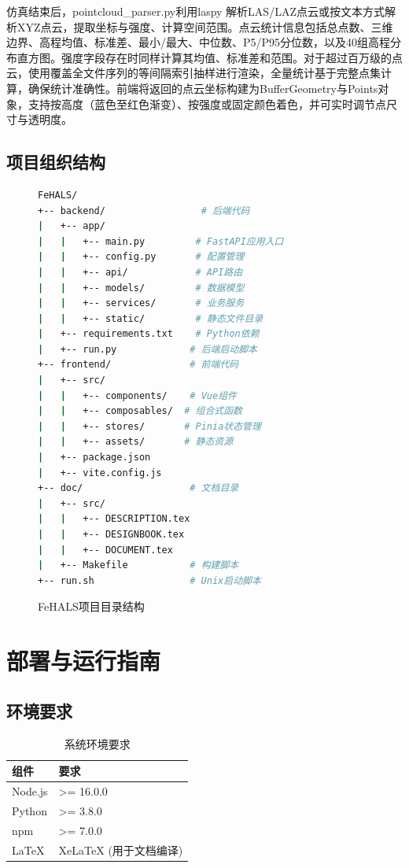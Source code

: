 \documentclass[a4paper,fleqn]{cas-sc}
\begin{document}
仿真结束后，pointcloud\_parser.py利用laspy \citep{laspy} 解析LAS/LAZ点云或按文本方式解析XYZ点云，提取坐标与强度、计算空间范围。点云统计信息包括总点数、三维边界、高程均值、标准差、最小/最大、中位数、P5/P95分位数，以及40组高程分布直方图。强度字段存在时同样计算其均值、标准差和范围。对于超过百万级的点云，使用覆盖全文件序列的等间隔索引抽样进行渲染，全量统计基于完整点集计算，确保统计准确性。前端将返回的点云坐标构建为BufferGeometry与Points对象，支持按高度（蓝色至红色渐变）、按强度或固定颜色着色，并可实时调节点尺寸与透明度。

\subsection{项目组织结构}
\begin{figure}[pos=!htbp]
    \centering
    \caption{FeHALS项目目录结构}
    \begin{lstlisting}[language=bash]
FeHALS/
+-- backend/                 # 后端代码
|   +-- app/
|   |   +-- main.py         # FastAPI应用入口
|   |   +-- config.py       # 配置管理
|   |   +-- api/            # API路由
|   |   +-- models/         # 数据模型
|   |   +-- services/       # 业务服务
|   |   +-- static/         # 静态文件目录
|   +-- requirements.txt    # Python依赖
|   +-- run.py             # 后端启动脚本
+-- frontend/              # 前端代码
|   +-- src/
|   |   +-- components/    # Vue组件
|   |   +-- composables/  # 组合式函数
|   |   +-- stores/       # Pinia状态管理
|   |   +-- assets/       # 静态资源
|   +-- package.json
|   +-- vite.config.js
+-- doc/                   # 文档目录
|   +-- src/
|   |   +-- DESCRIPTION.tex
|   |   +-- DESIGNBOOK.tex
|   |   +-- DOCUMENT.tex
|   +-- Makefile           # 构建脚本
+-- run.sh                 # Unix启动脚本
  \end{lstlisting}
    \label{fig:project-structure}
\end{figure}

\FloatBarrier

\section{部署与运行指南}

\subsection{环境要求}
\begin{table}[pos=!htbp]
    \centering
    \caption{系统环境要求}
    \begin{tabular}{@{} ll @{}}
        \toprule
        \textbf{组件} & \textbf{要求}      \\
        \midrule
        Node.js     & >= 16.0.0        \\
        Python      & >= 3.8.0         \\
        npm         & >= 7.0.0         \\
        LaTeX       & XeLaTeX (用于文档编译) \\
        \bottomrule
    \end{tabular}
\end{table}
\end{document}
